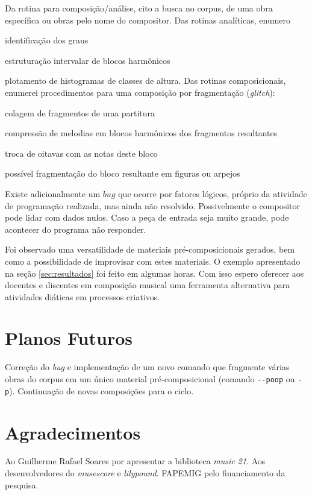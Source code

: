 \documentclass[12pt]{article}
\begin{document}
Da rotina para composição/análise, cito a busca no corpus, de uma obra específica ou obras pelo nome do compositor. Das rotinas analíticas, enumero \begin{inparaenum}
\item identificação dos graus
\item estruturação intervalar de blocos harmônicos
\item plotamento de histogramas de classes de altura. Das rotinas composicionais, enumerei procedimentos para uma composição por fragmentação (\emph{glitch}):
\item colagem de fragmentos de uma partitura
\item compressão de melodias em blocos harmônicos dos fragmentos resultantes
\item troca de oitavas com as notas deste bloco
\item possível fragmentação do bloco resultante em figuras ou arpejos
\end{inparaenum}Existe adicionalmente um $bug$ que ocorre por fatores lógicos, próprio da atividade de programação realizada, mas ainda não resolvido. Possivelmente o compositor pode lidar com dados nulos. Caso a peça de entrada seja muito grande, pode acontecer do programa não responder. 

Foi observado uma versatilidade de materiais pré-composicionais gerados, bem como a possibilidade de improvisar com estes materiais. O exemplo apresentado na seção \ref{sec:resultados} foi feito em algumas horas. Com isso espero oferecer aos docentes e discentes em composição musical uma ferramenta alternativa para atividades diáticas em processos criativos.

\section{Planos Futuros}

Correção do \emph{bug} e implementação de um novo comando que fragmente várias obras do corpus em um único material pré-composicional (comando \verb|--poop| ou \verb|-p|). Continuação de novas composições para o ciclo.

\section{Agradecimentos}

Ao Guilherme Rafael Soares por apresentar a biblioteca \emph{music 21}. Aos desenvolvedores do \emph{musescore} e \emph{lilypound}. FAPEMIG pelo financiamento da pesquisa.


\clearpage\clearpage


\end{document}
